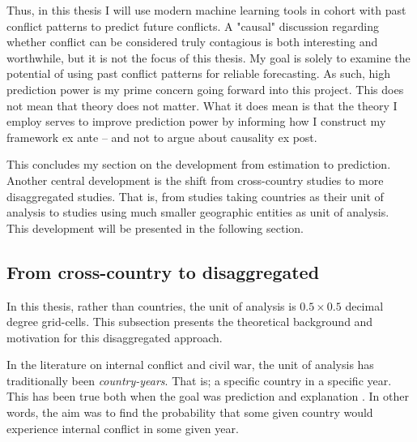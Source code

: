 \documentclass[a4paper]{article}
\begin{document}
Thus, in this thesis I will use modern machine learning tools in cohort with past conflict patterns to predict future conflicts. A "causal" discussion regarding whether conflict can be considered truly contagious is both interesting and worthwhile, but it is not the focus of this thesis. My goal is solely to examine the potential of using past conflict patterns for reliable forecasting. As such, high prediction power is my prime concern going forward into this project. This does not mean that theory does not matter. What it does mean is that the theory I employ serves to improve prediction power by informing how I construct my framework ex ante -- and not to argue about causality ex post.\par 

This concludes my section on the development from estimation to prediction. Another central development is the shift from cross-country studies to more disaggregated studies. That is, from studies taking countries as their unit of analysis to studies using much smaller geographic entities as unit of analysis. This development will be presented in the following section.\par


\subsection{From cross-country to disaggregated} %

In this thesis, rather than countries, the unit of analysis is $0.5\times0.5$ decimal degree grid-cells. This subsection presents the theoretical background and motivation for this disaggregated approach.\par

In the literature on internal conflict and civil war, the unit of analysis has traditionally been \emph{country-years}. That is; a specific country in a specific year. This has been true both when the goal was prediction \citep{Goldstone_2010, mueller_2016} and explanation \citep{Collier_Hoeffler_1998, Fearon_Laitin_2003, Collier_Hoeffler_2004, Hegre_Sambanis_2006}. In other words, the aim was to find the probability that some given country would experience internal conflict in some given year.\par
\end{document}
